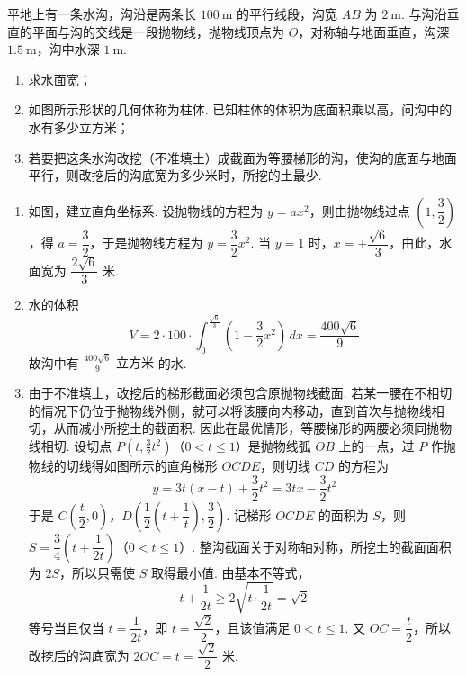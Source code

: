 \begin{problem}
平地上有一条水沟，沟沿是两条长 \(100\mathrm{~m}\) 的平行线段，沟宽 \(AB\) 为 \(2\mathrm{~m}\). 与沟沿垂直的平面与沟的交线是一段抛物线，抛物线顶点为 \(O\)，对称轴与地面垂直，沟深 \(1.5\mathrm{~m}\)，沟中水深 \(1\mathrm{~m}\).

\begin{enumerate}
\item 求水面宽；
\item 如图所示形状的几何体称为柱体. 已知柱体的体积为底面积乘以高，问沟中的水有多少立方米；
\item 若要把这条水沟改挖（不准填土）成截面为等腰梯形的沟，使沟的底面与地面平行，则改挖后的沟底宽为多少米时，所挖的土最少.
\end{enumerate}

\FloatBarrier
\end{problem}

\begin{solution}
\begin{enumerate}
\item 如图，建立直角坐标系.
设抛物线的方程为 \(y=ax^2\)，则由抛物线过点 \(\left(1,\dfrac32\right)\)，得 \(a=\dfrac32\)，于是抛物线方程为 \(y=\dfrac32x^2\). 当 \(y=1\) 时，\(x=\pm\dfrac{\sqrt6}{3}\)，由此，水面宽为 \(\dfrac{2\sqrt6}{3}\text{ 米}\).

\item 水的体积
\[
V=2\cdot100\cdot\int_0^{\frac{\sqrt6}{3}}\left(1-\frac32x^2\right)\,dx
=\frac{400\sqrt6}{9}
\]
故沟中有 \(\frac{400\sqrt6}{9}\text{ 立方米}\) 的水.

\item 由于不准填土，改挖后的梯形截面必须包含原抛物线截面. 若某一腰在不相切的情况下仍位于抛物线外侧，就可以将该腰向内移动，直到首次与抛物线相切，从而减小所挖土的截面积. 因此在最优情形，等腰梯形的两腰必须同抛物线相切.
设切点 \(P\left(t,\frac32t^2\right)\)（\(0<t\le1\)）是抛物线弧 \(OB\) 上的一点，过 \(P\) 作抛物线的切线得如图所示的直角梯形 \(OCDE\)，则切线 \(CD\) 的方程为
\[
y=3t(x-t)+\frac32t^2=3tx-\frac32t^2
\]
于是 \(C\left(\dfrac{t}{2},0\right)\)，\(D\left(\dfrac12\left(t+\dfrac1t\right),\dfrac32\right)\).
记梯形 \(OCDE\) 的面积为 \(S\)，则 \(S=\dfrac34\left(t+\dfrac1{2t}\right)\)（\(0<t\le1\)）.
整沟截面关于对称轴对称，所挖土的截面面积为 \(2S\)，所以只需使 \(S\) 取得最小值. 由基本不等式，
\[
t+\frac{1}{2t}\ge 2\sqrt{t\cdot\frac{1}{2t}}=\sqrt2
\]
等号当且仅当 \(t=\dfrac{1}{2t}\)，即 \(t=\dfrac{\sqrt2}{2}\)，且该值满足 \(0<t\le1\). 又 \(OC=\dfrac{t}{2}\)，所以改挖后的沟底宽为 \(2OC=t=\dfrac{\sqrt2}{2}\text{ 米}\).
\end{enumerate}
\end{solution}

